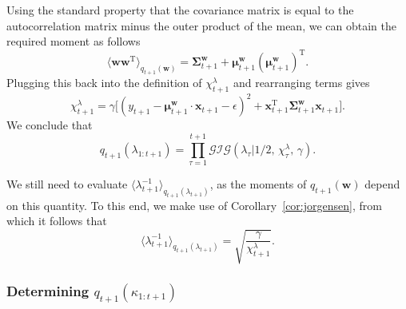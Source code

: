 Using the standard property that the covariance matrix is equal to the autocorrelation matrix minus the outer product of the mean, we can obtain the required moment as follows
\begin{equation}
	\langle\mathbf{w}\mathbf{w}^\text{T}\rangle_{q_{t+1}(\mathbf{w})}
	= \boldsymbol{\Sigma}_{t+1}^\mathbf{w} + \boldsymbol{\mu}_{t+1}^\mathbf{w}(\boldsymbol{\mu}_{t+1}^\mathbf{w})^\text{T}.
\end{equation}
Plugging this back into the definition of $\chi_{t+1}^\lambda$ and rearranging terms gives
\begin{equation}
	\chi_{t+1}^\lambda
	= \gamma\big[(y_{t+1} - \boldsymbol{\mu}_{t+1}^\mathbf{w}\cdot\mathbf{x}_{t+1} - \epsilon)^2 + \mathbf{x}_{t+1}^\text{T}\boldsymbol{\Sigma}_{t+1}^\mathbf{w}\mathbf{x}_{t+1}\big].
\end{equation}
We conclude that
\begin{equation}
	q_{t+1}(\lambda_{1:t+1})
	= \prod_{\tau=1}^{t+1}
	\mathcal{GIG}(\lambda_\tau|1/2,\, \chi_\tau^\lambda,\, \gamma).
\end{equation}

We still need to evaluate $\langle\lambda_{t+1}^{-1}\rangle_{q_{t+1}(\lambda_{t+1})}$, as the moments of $q_{t+1}(\mathbf{w})$ depend on this quantity. To this end, we make use of Corollary~\ref{cor:jorgensen},
from which it follows that
\begin{equation}
	\langle\lambda_{t+1}^{-1}\rangle_{q_{t+1}(\lambda_{t+1})}
	= \sqrt{\frac{\gamma}{\chi_{t+1}^\lambda}}.
\end{equation}

\subsubsection{Determining $q_{t+1}(\kappa_{1:t+1})$}

